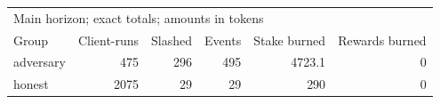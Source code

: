 \begin{tabular}{lrrrrr}
\toprule
\multicolumn{6}{l}{Main horizon; exact totals; amounts in tokens} \\
Group & Client-runs & Slashed & Events & Stake burned & Rewards burned \\
\midrule
adversary & 475 & 296 & 495 & 4723.1 & 0 \\
honest & 2075 & 29 & 29 & 290 & 0 \\
\bottomrule
\end{tabular}
